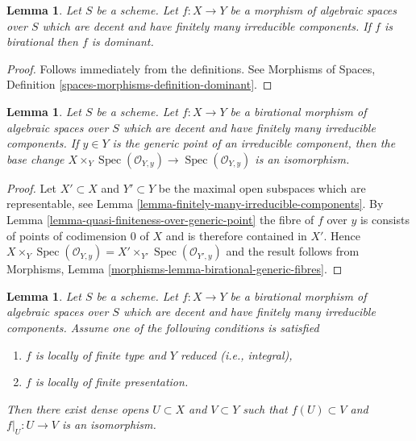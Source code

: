 \documentclass{stacks-project}
\theoremstyle{plain}
\newtheorem{lemma}[subsection]{Lemma}
\theoremstyle{definition}
\theoremstyle{remark}
\numberwithin{equation}{subsection}
\def\Spec{\mathop{\mathrm{Spec}}}
\begin{document}
\begin{lemma}
\label{lemma-birational-dominant}
Let $S$ be a scheme.
Let $f : X \to Y$ be a morphism of algebraic spaces over $S$ which
are decent and have finitely many irreducible components. If $f$ is
birational then $f$ is dominant.
\end{lemma}

\begin{proof}
Follows immediately from the definitions. See
Morphisms of Spaces, Definition \ref{spaces-morphisms-definition-dominant}.
\end{proof}

\begin{lemma}
\label{lemma-birational-generic-fibres}
Let $S$ be a scheme. Let $f : X \to Y$ be a birational morphism of
algebraic spaces over $S$ which are decent and have finitely
many irreducible components. If $y \in Y$ is the generic point of
an irreducible component, then the base change
$X \times_Y \Spec(\mathcal{O}_{Y, y}) \to \Spec(\mathcal{O}_{Y, y})$
is an isomorphism.
\end{lemma}

\begin{proof}
Let $X' \subset X$ and $Y' \subset Y$ be the maximal open subspaces
which are representable, see
Lemma \ref{lemma-finitely-many-irreducible-components}. By
Lemma \ref{lemma-quasi-finiteness-over-generic-point}
the fibre of $f$ over $y$ is consists
of points of codimension $0$ of $X$ and is therefore contained
in $X'$. Hence $X \times_Y \Spec(\mathcal{O}_{Y, y}) =
X' \times_{Y'} \Spec(\mathcal{O}_{Y', y})$ and the result follows
from Morphisms, Lemma \ref{morphisms-lemma-birational-generic-fibres}.
\end{proof}

\begin{lemma}
\label{lemma-birational-birational}
Let $S$ be a scheme. Let $f : X \to Y$ be a birational morphism of
algebraic spaces over $S$ which are decent and have finitely many
irreducible components. Assume one of the following conditions is satisfied
\begin{enumerate}
\item $f$ is locally of finite type and $Y$ reduced (i.e., integral),
\item $f$ is locally of finite presentation.
\end{enumerate}
Then there exist dense opens $U \subset X$ and $V \subset Y$
such that $f(U) \subset V$ and $f|_U : U \to V$ is an isomorphism.
\end{lemma}
\end{document}
